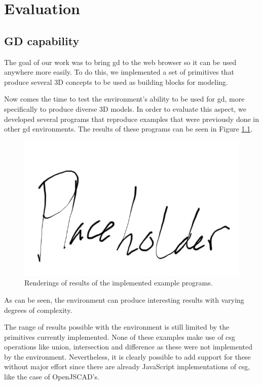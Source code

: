 
\chapter{Evaluation}
\label{chapter:evaluation}




\section{GD capability}
The goal of our work was to bring \gls{gd} to the web browser so it can be used anywhere more easily.
To do this, we implemented a set of primitives that produce several 3D concepts to be used as building blocks for modeling.

Now comes the time to test the environment's ability to be used for \gls{gd}, more specifically to produce diverse 3D models.
In order to evaluate this aspect, we developed several programs that reproduce examples that were previously done in other \gls{gd} environments.
The results of these programs can be seen in Figure \ref{fig:all:examples}.

\begin{figure}
  \centering
  \includegraphics[width=12cm]{./images/all_examples}
  \caption{Renderings of results of the implemented example programs.}
  \label{fig:all:examples}
\end{figure}

As can be seen, the environment can produce interesting results with varying degrees of complexity.

The range of results possible with the environment is still limited by the primitives currently implemented.
None of these examples make use of \gls{csg} operations like union, intersection and difference as these were not implemented by the environment.
Nevertheless, it is clearly possible to add support for these without major effort since there are already JavaScript implementations of \gls{csg}, like the case of OpenJSCAD's.


